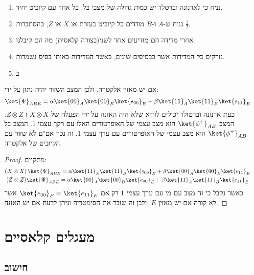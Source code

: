 \documentclass{tstextbook}
\begin{document}
\begin{proposition}
  \begin{enumerate}
    \item נניח כי לארנונה וברטלד יש כמות גדולה של מצבי בל. כל אחד עם קיוביט יחיד. 


    \item נניח ש-\(A\) ו-\(B\) מודדים כל קיוביט בעזרת או \(X\) או \(Z\), בהסתברות \(\frac{1}{2}\).  


    \item אחרי מדידה הם מודיעים אחד לשני(בצורה קלאסית) מה הם קיבלנו. 


    \item נזרקים כל המדידות אשר בבסיסים שונים, כאשר המדידות באותו בסיס נשמרות. 


    \item ב 


  \end{enumerate}
\end{proposition}
\begin{proposition}
אם יש מאזין אלקטרה. ולכן המצב השזור יהיה נתון על ידי:
$$\ket{\Psi}_{ABE} = \alpha\ket{00}_{A}\ket{00}_{B}\ket{e_{00}}_{E}+\beta\ket{11}_{A}\ket{11}_{B}\ket{e_{11}}_{E}$$
כעת ארנונה וברטולד יכולים לוודא שלא היה האזנה על ידי הפעלה של \(X\otimes X\) ו-\(Z \otimes Z\). המצב \(\ket{\phi^{+}}_{AB}\) הוא מצב עצמי של האופרטורים האלו עם רקך עצמי 1.  המצב בל \(\ket{\phi^{+}}_{AB}\) הוא מצב עצמי של האופרטורים עם ערך עצמי 1. זה נכון אם"ם לא שזור עם הקיוביט של אלקטרה.

\end{proposition}
\begin{proof}
מתקיים:
\begin{gather*}\left( X \otimes X \right) \ket{\Psi}_{ABE} = \alpha\ket{11}_{A}\ket{11}_{B}\ket{e_{00}}_{E}+\beta\ket{00}_{A}\ket{00}_{B}\ket{e_{11}}_{E}  \\(Z \otimes Z) \ket{\Psi}_{ABE} = \alpha\ket{00}_{A}\ket{00}_{B}\ket{e_{00}}_{E}+\beta\ket{11}_{A}\ket{11}_{B}\ket{e_{11}}_{E}
\end{gather*}
כאשר נקבל כי זה מצב עם מי עם ערך עצמי 1 רק אם \(\ket{e_{00}}_E = \ket{e_{11}}_E\) אשר לא קורה אם יש מאזין \(E\). ולכן זה שובר את הסימטריה וניתן לדעת אם יש האזנה.

\end{proof}
\chapter{מעגלים קלאסיים}

\section{חישוב}
\end{document}
